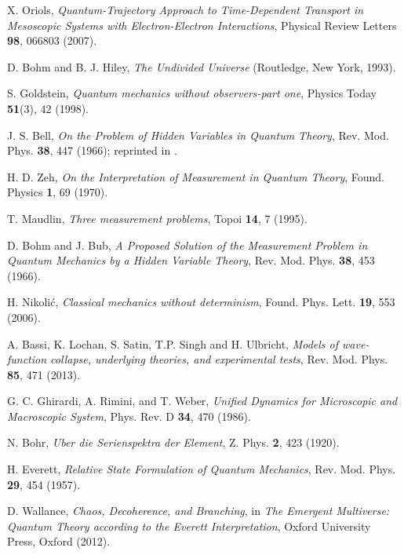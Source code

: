 \documentclass[nofootinbib, secnumarabic, amsmath, nobibnotes,10pt,aps,pra]{revtex4-1}
\begin{document}
\begin{thebibliography}{999}
X. Oriols, \emph{Quantum-Trajectory Approach to Time-Dependent Transport in Mesoscopic Systems with Electron-Electron Interactions}, Physical Review Letters \textbf{98},  066803 (2007).

D. Bohm and B. J. Hiley, \emph{The Undivided Universe} (Routledge, New York, 1993).

S. Goldstein, \emph{Quantum mechanics without observers-part one}, Physics Today \textbf{51}(3),  42 (1998).

J. S. Bell, \emph{On the Problem of Hidden Variables in Quantum Theory}, Rev. Mod. Phys. \textbf{38},  447 (1966); reprinted in \cite{om.Bell1987}.

H. D. Zeh, 
\textit{On the Interpretation of Measurement in Quantum Theory}, 
Found. Physics \textbf{1},  69 (1970).

T. Maudlin, 
\textit{Three measurement problems},
Topoi \textbf{14}, 7 (1995).

D. Bohm and J. Bub, 
\textit{A Proposed Solution of the Measurement Problem in Quantum Mechanics by a Hidden Variable Theory},
Rev. Mod. Phys. \textbf{38}, 453 (1966).

H. Nikoli\'c,
\textit{Classical mechanics without determinism},
Found. Phys. Lett. \textbf{19}, 553 (2006).

A. Bassi, K. Lochan, S. Satin, T.P. Singh  and H. Ulbricht, 
\textit{Models of wave-function collapse, underlying theories, and experimental tests}, 
Rev. Mod. Phys. \textbf{85}, 471 (2013).

G. C. Ghirardi, A. Rimini, and T. Weber,
\textit{Unified Dynamics for Microscopic and Macroscopic System},
Phys. Rev. D \textbf{34}, 470 (1986).

N. Bohr,
\textit{Uber die Serienspektra der Element},
Z. Phys. \textbf{2}, 423 (1920).

H. Everett,
\textit{Relative State Formulation of Quantum Mechanics},
Rev. Mod. Phys. \textbf{29},  454 (1957).

D. Wallance,
\textit{Chaos, Decoherence, and Branching},
in \textit{The Emergent Multiverse: Quantum Theory according to the Everett Interpretation},
Oxford University Press, Oxford (2012).


\end{thebibliography}
\end{document}
